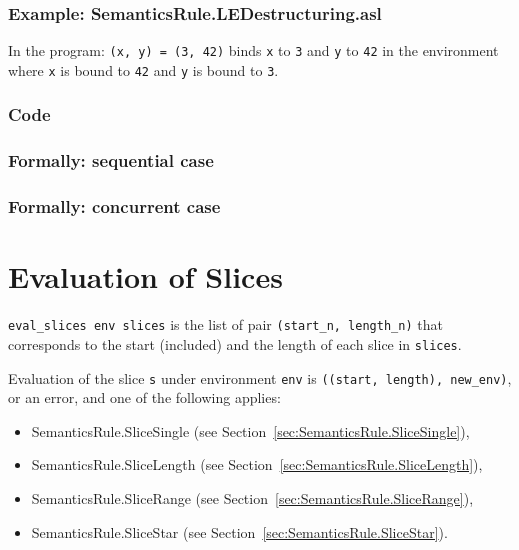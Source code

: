 \documentclass{book}
\begin{document}
    \subsection{Example: SemanticsRule.LEDestructuring.asl}
    In the program:
    \texttt{(x, y) = (3, 42)} binds \texttt{x} to \texttt{3} and \texttt{y} to \texttt{42} in the environment where \texttt{x} is bound to \texttt{42} and \texttt{y} is bound to \texttt{3}.

  \subsection{Code}

\begin{emptyformal}
  \subsection{Formally: sequential case}

  \subsection{Formally: concurrent case}
\end{emptyformal}


\chapter{Evaluation of Slices \label{chap:eval_slices}}
\texttt{eval\_slices env slices} is the list of pair \texttt{(start\_n, length\_n)} that
corresponds to the start (included) and the length of each slice in
\texttt{slices}.

Evaluation of the slice \texttt{s} under environment \texttt{env} is
\texttt{((start, length), new\_env)}, or an error, and one of the following applies:
\begin{itemize}
\item SemanticsRule.SliceSingle (see Section~\ref{sec:SemanticsRule.SliceSingle}),
\item SemanticsRule.SliceLength (see Section~\ref{sec:SemanticsRule.SliceLength}),
\item SemanticsRule.SliceRange (see Section~\ref{sec:SemanticsRule.SliceRange}),
\item SemanticsRule.SliceStar (see Section~\ref{sec:SemanticsRule.SliceStar}).
\end{itemize}
\end{document}
